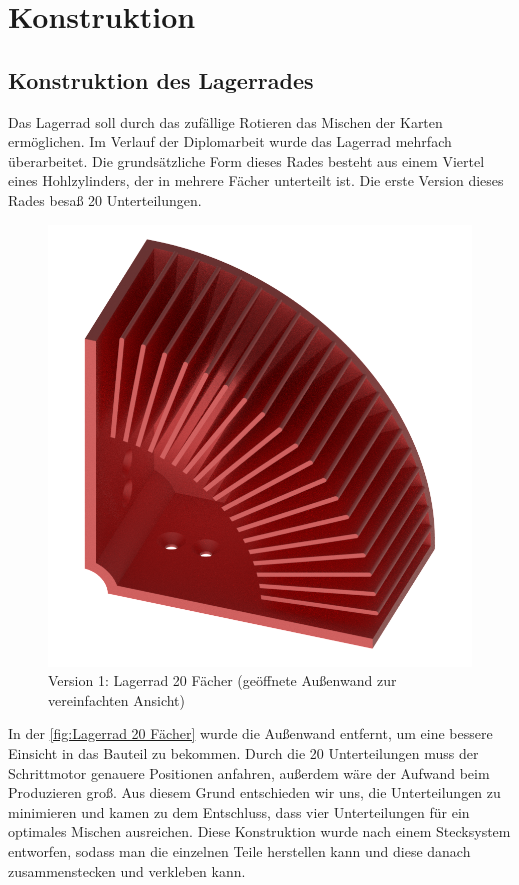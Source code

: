 \pagebreak
\section{Konstruktion}
\subsection{Konstruktion des Lagerrades}
Das Lagerrad soll durch das zufällige Rotieren das Mischen der Karten ermöglichen.
Im Verlauf der Diplomarbeit wurde das Lagerrad mehrfach überarbeitet.
Die grundsätzliche Form dieses Rades besteht aus einem Viertel eines Hohlzylinders, der in mehrere Fächer unterteilt ist.
Die erste Version dieses Rades besaß 20 Unterteilungen.

\begin{figure}[H]
    \centering
    \includegraphics[scale=0.5,page=1]{fig/mech/LagerRad}
    \caption{Version 1: Lagerrad 20 Fächer (geöffnete Außenwand zur vereinfachten Ansicht)}
    \label{fig:Lagerrad 20 Fächer}
\end{figure}
In der \autoref{fig:Lagerrad 20 Fächer} wurde die Außenwand entfernt, um eine bessere Einsicht in das Bauteil zu bekommen.
Durch die 20 Unterteilungen muss der Schrittmotor genauere Positionen anfahren, außerdem wäre der Aufwand beim Produzieren groß.
Aus diesem Grund entschieden wir uns, die Unterteilungen zu minimieren und kamen zu dem Entschluss, dass vier Unterteilungen für ein optimales Mischen ausreichen.
Diese Konstruktion wurde nach einem Stecksystem entworfen, sodass man die einzelnen Teile herstellen kann und diese danach zusammenstecken und verkleben kann.

